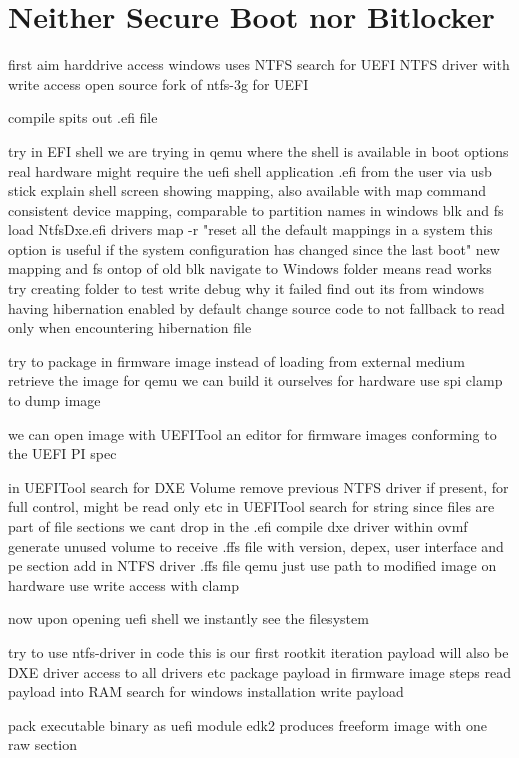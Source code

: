 
\section{Neither Secure Boot nor Bitlocker}
first aim harddrive access
windows uses NTFS
search for UEFI NTFS driver with write access
\cite{ntfs-3g}
open source fork of ntfs-3g for UEFI

compile
spits out .efi file

try in EFI shell
we are trying in qemu where the shell is available in boot options
real hardware might require the uefi shell application .efi from the user via usb stick
explain shell screen
showing mapping, also available with map command
consistent device mapping, comparable to partition names in windows
\cite{uefi-shell}
blk and fs
load NtfsDxe.efi
drivers
map -r "reset all the default mappings in a system this option is useful if the system configuration has changed since the last boot"
new mapping and fs ontop of old blk
navigate to Windows folder
means read works
try creating folder to test write
debug why it failed
find out its from windows having hibernation enabled by default
change source code to not fallback to read only when encountering hibernation file

try to package in firmware image instead of loading from external medium
retrieve the image
for qemu we can build it ourselves
for hardware use spi clamp to  dump image

we can open image with UEFITool
an editor for firmware images conforming to the UEFI PI spec \cite{uefitool}

in UEFITool search for DXE Volume
remove previous NTFS driver if present, for full control, might be read only etc
in UEFITool search for string
since files are part of file sections we cant drop in the .efi
compile dxe driver within ovmf
generate unused volume to receive .ffs file with version, depex, user interface and pe section
add in NTFS driver .ffs file
qemu just use path to modified image
on hardware use write access with clamp

now upon opening uefi shell
we instantly see the filesystem

try to use ntfs-driver in code
this is our first rootkit iteration
payload will also be DXE driver
access to all drivers etc
package payload in firmware image
steps
read payload into RAM
search for windows installation
write payload

pack executable binary as uefi module
edk2 produces freeform image with one raw section

